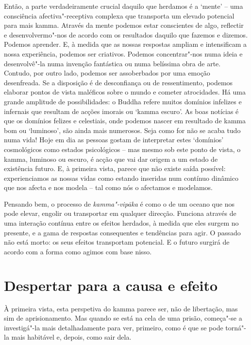 Então, a parte verdadeiramente crucial daquilo que herdamos é a `mente' -- uma
consciência afectiva"-receptiva complexa que transporta um elevado potencial para
mais kamma. Através da mente podemos estar conscientes de algo, reflectir e
desenvolvermo"-nos de acordo com os resultados daquilo que fazemos e dizemos.
Podemos aprender. E, à medida que as nossas respostas ampliam e intensificam a
nossa experiência, podemos ser criativos. Podemos concentrar"-nos numa ideia e
desenvolvê"-la numa invenção fantástica ou numa belíssima obra de arte. Contudo,
por outro lado, podemos ser assoberbados por uma emoção desenfreada. Se a
disposição é de desconfiança ou de ressentimento, podemos elaborar pontos de
vista maléficos sobre o mundo e cometer atrocidades. Há uma grande amplitude de
possibilidades: o Buddha refere muitos domínios infelizes e infernais que
resultam de acções imorais ou `kamma escuro'. As boas notícias é que os domínios
felizes e celestiais, onde podemos nascer em resultado de kamma bom ou
`luminoso', são ainda mais numerosos.
Seja como for não se acaba tudo
numa vida! Hoje em dia as pessoas gostam de interpretar estes `domínios'
cosmológicos como estados psicológicos -- mas mesmo sob este ponto de vista, o
kamma, luminoso ou escuro, é acção que vai dar origem a um estado de existência
futuro. E, à primeira vista, parece que não existe saída possível:
experienciamos as nossas vidas como estando inseridas num contínuo dinâmico que
nos afecta e nos modela -- tal como nós o afectamos e modelamos.

Pensando bem, o processo de \emph{kamma"-vipāka} é como o de um oceano que nos
pode elevar, engolir ou transportar em qualquer direcção. Funciona através de
uma interação contínua entre os efeitos herdados, à medida que eles surgem no
presente, e a gama de respostas consequentes e tendências para agir. O passado
não está morto: os seus efeitos transportam potencial. E o futuro surgirá de
acordo com a forma como agimos com base nisso.

\section{Despertar para a causa e efeito}

À primeira vista, esta perspetiva do kamma parece ser, não de libertação, mas
sim de aprisionamento. Mas quando se está na cela de uma prisão, começa"-se a
investigá"-la mais detalhadamente para ver, primeiro, como é que se pode torná"-la
mais habitável e, depois, como sair dela.

